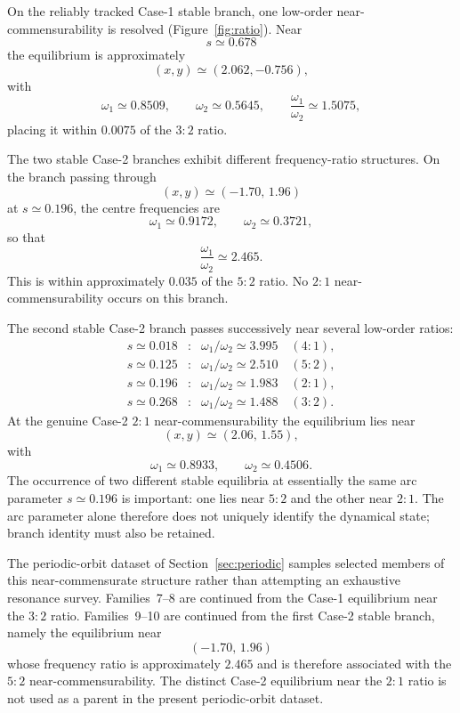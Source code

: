 On the reliably tracked Case-1 stable branch, one low-order
near-commensurability is resolved (Figure~\ref{fig:ratio}). Near
\[
s\simeq0.678
\]
the equilibrium is approximately
\[
(x,y)\simeq(2.062,-0.756),
\]
with
\[
\omega_1\simeq0.8509,
\qquad
\omega_2\simeq0.5645,
\qquad
\frac{\omega_1}{\omega_2}\simeq1.5075,
\]
placing it within $0.0075$ of the $3{:}2$ ratio.

The two stable Case-2 branches exhibit different frequency-ratio
structures. On the branch passing through
\[
(x,y)\simeq(-1.70,\,1.96)
\]
at $s\simeq0.196$, the centre frequencies are
\[
\omega_1\simeq0.9172,
\qquad
\omega_2\simeq0.3721,
\]
so that
\begin{equation}
\frac{\omega_1}{\omega_2}
\simeq2.465.
\label{eq:case2_5to2_ratio}
\end{equation}
This is within approximately $0.035$ of the $5{:}2$ ratio. No $2{:}1$
near-commensurability occurs on this branch.

The second stable Case-2 branch passes successively near several low-order
ratios:
\[
\begin{array}{ccl}
s\simeq0.018
&:&
\omega_1/\omega_2\simeq3.995
\quad (4{:}1),
\\[1mm]
s\simeq0.125
&:&
\omega_1/\omega_2\simeq2.510
\quad (5{:}2),
\\[1mm]
s\simeq0.196
&:&
\omega_1/\omega_2\simeq1.983
\quad (2{:}1),
\\[1mm]
s\simeq0.268
&:&
\omega_1/\omega_2\simeq1.488
\quad (3{:}2).
\end{array}
\]
At the genuine Case-2 $2{:}1$ near-commensurability the equilibrium lies
near
\[
(x,y)\simeq(2.06,\,1.55),
\]
with
\[
\omega_1\simeq0.8933,
\qquad
\omega_2\simeq0.4506.
\]
The occurrence of two different stable equilibria at essentially the same
arc parameter $s\simeq0.196$ is important: one lies near $5{:}2$ and the
other near $2{:}1$. The arc parameter alone therefore does not uniquely
identify the dynamical state; branch identity must also be retained.

The periodic-orbit dataset of Section~\ref{sec:periodic} samples selected members of this
near-commensurate structure rather than attempting an exhaustive resonance
survey. Families~7--8 are continued from the Case-1 equilibrium near the
$3{:}2$ ratio. Families~9--10 are continued from the first Case-2 stable
branch, namely the equilibrium near
\[
(-1.70,\,1.96)
\]
whose frequency ratio is approximately $2.465$ and is therefore associated
with the $5{:}2$ near-commensurability. The distinct Case-2 equilibrium
near the $2{:}1$ ratio is not used as a parent in the present
periodic-orbit dataset.

